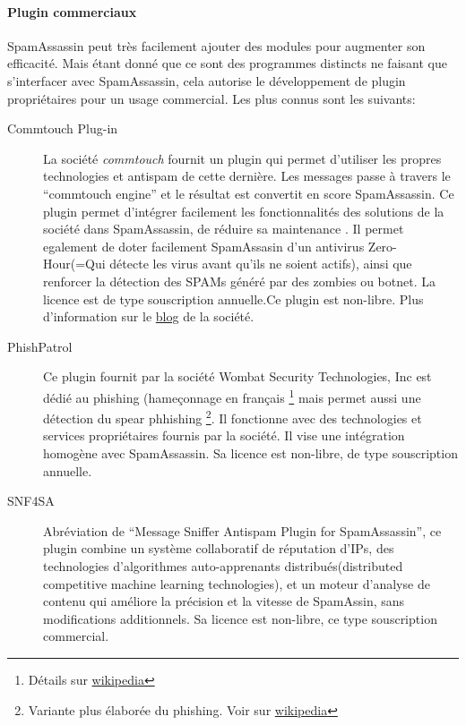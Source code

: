 \documentclass[a4paper,11pt]{article}
\begin{document}
\paragraph{Plugin commerciaux}
SpamAssassin peut très facilement ajouter des modules pour augmenter son efficacité. Mais étant donné 
que ce sont des programmes distincts ne faisant que s'interfacer avec SpamAssassin, cela
autorise le développement de plugin propriétaires pour un usage commercial. Les plus connus sont les suivants:
\begin{description}
 \item [Commtouch Plug-in \label{cyren}] La société \emph{commtouch} fournit un plugin qui permet d'utiliser les propres technologies
 et antispam de cette dernière. Les messages passe à travers le ``commtouch engine'' et le résultat est convertit en score SpamAssassin.
 Ce plugin permet d'intégrer facilement les fonctionnalités des solutions de la société dans SpamAssassin, de réduire 
 sa maintenance . Il permet egalement de doter facilement SpamAssasin d'un antivirus Zero-Hour(=Qui détecte les virus avant qu'ils ne soient actifs),
 ainsi que renforcer la détection des SPAMs généré par des zombies ou botnet.
 La licence est de type souscription annuelle.Ce plugin est non-libre. 
 Plus d'information sur le \href{http://blog.cyren.com/articles/spamassassin-what-it-is-how-commtouchs-plug-works-with-it-1407.html}{blog} de la société.
 \item[PhishPatrol] Ce plugin fournit par la société Wombat Security Technologies, Inc est dédié au phishing (hameçonnage en français \footnote{Détails sur \href{http://fr.wikipedia.org/wiki/Hame\%C3\%A7onnage}{wikipedia}}
 mais permet aussi une détection du spear phhishing \footnote{Variante plus élaborée du phishing. Voir sur \href{http://fr.wikipedia.org/wiki/Spear_phishing}{wikipedia}}.
 Il fonctionne avec des technologies et services propriétaires fournis par la société. Il vise une intégration homogène avec SpamAssassin.
 Sa licence est non-libre, de type souscription annuelle.
 \item[SNF4SA] Abréviation de ``Message Sniffer Antispam Plugin for SpamAssassin'', ce plugin combine un système collaboratif de réputation
 d'IPs, des technologies d’algorithmes auto-apprenants distribués(distributed competitive machine learning technologies),
 et un moteur d'analyse de contenu qui améliore la précision et la vitesse de SpamAssin, sans modifications additionnels.
 Sa licence est non-libre, ce type souscription commercial.
\end{description}
\end{document}
